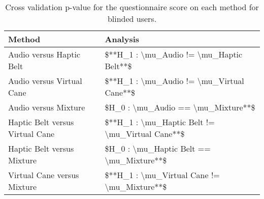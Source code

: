
\begin{table}[!htb]
\centering
\caption{Cross validation p-value for the questionnaire score on each method for blinded users.}
\label{tab:lsd_questionnaire}
\begin{tabular}{ll}
\toprule
                         Method &                                        Analysis \\
\midrule
       Audio versus Haptic Belt &        \$**H\_1 : \textbackslash mu\_Audio != \textbackslash mu\_Haptic Belt**\$ \\
      Audio versus Virtual Cane &       \$**H\_1 : \textbackslash mu\_Audio != \textbackslash mu\_Virtual Cane**\$ \\
           Audio versus Mixture &              \$H\_0 : \textbackslash mu\_Audio == \textbackslash mu\_Mixture**\$ \\
Haptic Belt versus Virtual Cane & \$**H\_1 : \textbackslash mu\_Haptic Belt != \textbackslash mu\_Virtual Cane**\$ \\
     Haptic Belt versus Mixture &        \$H\_0 : \textbackslash mu\_Haptic Belt == \textbackslash mu\_Mixture**\$ \\
    Virtual Cane versus Mixture &     \$**H\_1 : \textbackslash mu\_Virtual Cane != \textbackslash mu\_Mixture**\$ \\
\bottomrule
\end{tabular}
\end{table}

